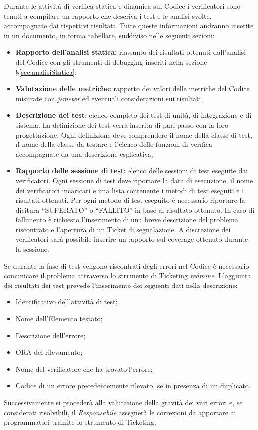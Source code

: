   Durante le attività di verifica statica e dinamica sul Codice i verificatori sono tenuti a compilare un rapporto che descriva i test e le analisi svolte, accompagnate dai rispettivi risultati. Tutte queste informazioni andranno inserite in un documento, in forma tabellare, suddiviso nelle seguenti sezioni:
  \begin{itemize}
 \item \textbf{Rapporto dell’analisi statica:} riassunto dei risultati ottenuti dall’analisi del Codice con gli strumenti di debugging inseriti nella sezione \S\ref{sec:analisiStatica};
  
  \item \textbf{Valutazione delle metriche:} rapporto dei valori delle metriche del Codice misurate con \emph{jsmeter} ed eventuali considerazioni sui risultati;
  \item \textbf{Descrizione dei test}: elenco completo dei test di unità, di integrazione e di sistema. La definizione dei test verrà inserita di pari passo con la loro progettazione.
  Ogni definizione deve comprendere il nome della classe di test, il nome della classe da testare e l’elenco delle funzioni di verifica accompagnate da una descrizione esplicativa;
  \item \textbf{Rapporto delle sessione di test:} elenco delle sessioni di test eseguite dai verificatori. Ogni sessione di test deve riportare la data di esecuzione, il nome dei verificatori incaricati e una lista contenente i metodi di test eseguiti e i risultati ottenuti. Per ogni metodo di test eseguito è necessario riportare la dicitura “SUPERATO” o “FALLITO” in base al risultato ottenuto. In caso
  di fallimento è richiesto l’inserimento di una breve descrizione del problema riscontrato e l’apertura di un Ticket di segnalazione. A discrezione dei verificatori sarà possibile inserire un rapporto sul coverage ottenuto durante la sessione.
 \end{itemize} 
  Se durante la fase di test vengono riscontrati degli errori nel Codice è necessario comunicare il problema attraverso lo strumento di Ticketing \emph{redmine}.
  L’aggiunta dei risultati dei test prevede l’inserimento dei seguenti dati nella  descrizione:
  \begin{itemize}
  \item Identificativo dell’attività di test;
  \item Nome dell’Elemento testato;
  \item Descrizione dell’errore;
  \item ORA del rilevamento;
  \item Nome del verificatore che ha trovato l’errore;
  \item Codice di un errore precedentemente rilevato, se in presenza di un duplicato.
 \end{itemize}
  Successivamente si procederà alla valutazione della gravità dei vari errori e, se considerati risolvibili, il \emph{Responsabile} assegnerà le correzioni da apportare ai programmatori tramite lo strumento di Ticketing.
